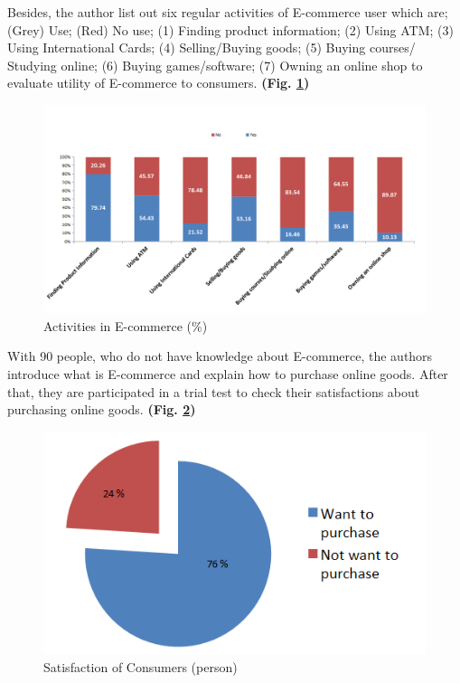 \documentclass[conference]{IEEEtran}
\begin{document}
Besides, the author list out six regular activities of E-commerce user which are; (Grey) Use; (Red) No use; (1) Finding product information; (2) Using ATM; (3) Using International Cards; (4) Selling/Buying goods; (5) Buying courses/ Studying online; (6) Buying games/software; (7) Owning an online shop to evaluate utility of E-commerce to consumers. \textbf{(Fig. \ref{fig:ecactivities})}

\begin{figure}[tbph]
\centering
\includegraphics[width=0.7\linewidth]{./ecactivities}
\caption{Activities in E-commerce (\%)}
\label{fig:ecactivities}
\end{figure}



With 90 people, who do not have knowledge about E-commerce, the authors introduce what is E-commerce and explain how to purchase online goods. After that, they are participated in a trial test to check their satisfactions about purchasing online goods. \textbf{(Fig. \ref{fig:satisfaction})}

\begin{figure}[h]
\centering
\includegraphics[width=0.7\linewidth]{./satisfaction}
\caption{Satisfaction of Consumers (person)}
\label{fig:satisfaction}
\end{figure}
\end{document}
